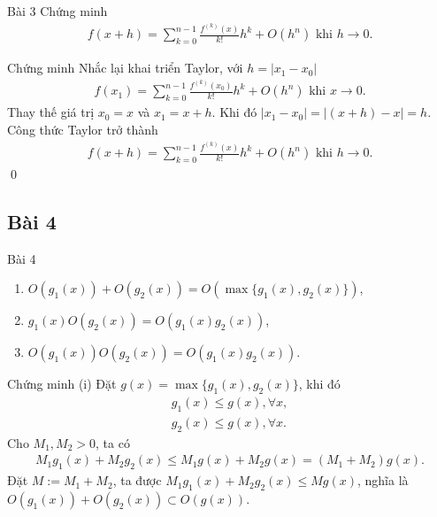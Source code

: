 \documentclass[9pt]{beamer}
\begin{document}
\begin{frame}
    \begin{block}{Bài 3}
    Chứng minh
    \begin{align*}
        f(x+h) = \sum_{k=0}^{n-1} \frac{f^{(k)}(x)}{k!} h^k + O(h^n) \text{ khi } h \to 0.
    \end{align*}
    \end{block}
    \begin{exampleblock}{Chứng minh}
    Nhắc lại khai triển Taylor, với $h = |x_1 - x_0|$
    \begin{align*}
        f(x_1) = \sum_{k=0}^{n-1}\frac{f^{(k)}(x_0)}{k!} h^k + O(h^n) \text{ khi } x \to 0.
    \end{align*}
    Thay thế giá trị $x_0 = x$ và $x_1 = x + h$. Khi đó $|x_1 - x_0| = |(x + h) - x| = h$. Công thức Taylor trở thành
    \begin{align*}
        f(x + h) = \sum_{k=0}^{n-1}\frac{f^{(k)}(x)}{k!} h^k + O(h^n) \text{ khi } h \to 0.
    \end{align*} \hfill \qed
    \end{exampleblock}
\end{frame}

\subsection{Bài 4}

\begin{frame}
    \begin{block}{Bài 4}
    \begin{enumerate}[label=(\roman*)]
        \item $O(g_1(x)) + O(g_2(x)) = O(\max \{g_1(x), g_2(x) \})$,
        \item $g_1(x) O(g_2(x)) = O(g_1(x) g_2(x))$,
        \item $O(g_1(x)) O(g_2(x)) = O(g_1(x) g_2(x))$.
    \end{enumerate}
    \end{block}
    
    \begin{exampleblock}{Chứng minh}
    (i) Đặt $g(x) = \max \{ g_1(x), g_2(x) \}$, khi đó
    \begin{align*}
        g_1(x) \le g(x), \forall x, \\
        g_2(x) \le g(x), \forall x.
    \end{align*}
    Cho $M_1, M_2 > 0$, ta có
    \begin{align*}
        M_1 g_1(x) + M_2 g_2(x) \le M_1 g(x) + M_2 g(x) = (M_1 + M_2) g(x).
    \end{align*}
    Đặt $M := M_1 + M_2$, ta được $M_1 g_1(x) + M_2 g_2(x) \le M g(x)$, nghĩa là $O(g_1(x)) + O(g_2(x)) \subset O(g(x))$.
    \end{exampleblock}
\end{frame}
\end{document}
